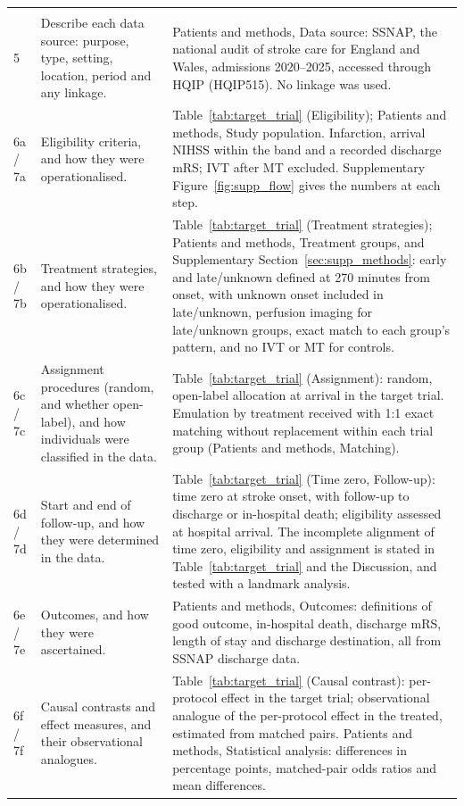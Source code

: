 {\begin{longtable}{p{1.0cm} p{4.6cm} p{10.4cm}}
\addlinespace
\multicolumn{3}{l}{\textbf{Methods}}\\
5 & Describe each data source: purpose, type, setting, location, period and any linkage. & Patients and methods, Data source: SSNAP, the national audit of stroke care for England and Wales, admissions 2020--2025, accessed through HQIP (HQIP515). No linkage was used. \\
6a / 7a & Eligibility criteria, and how they were operationalised. & Table~\ref{tab:target_trial} (Eligibility); Patients and methods, Study population. Infarction, arrival NIHSS within the band and a recorded discharge mRS; IVT after MT excluded. Supplementary Figure~\ref{fig:supp_flow} gives the numbers at each step. \\
6b / 7b & Treatment strategies, and how they were operationalised. & Table~\ref{tab:target_trial} (Treatment strategies); Patients and methods, Treatment groups, and Supplementary Section~\ref{sec:supp_methods}: early and late/unknown defined at 270 minutes from onset, with unknown onset included in late/unknown, perfusion imaging for late/unknown groups, exact match to each group's pattern, and no IVT or MT for controls. \\
6c / 7c & Assignment procedures (random, and whether open-label), and how individuals were classified in the data. & Table~\ref{tab:target_trial} (Assignment): random, open-label allocation at arrival in the target trial. Emulation by treatment received with 1:1 exact matching without replacement within each trial group (Patients and methods, Matching). \\
6d / 7d & Start and end of follow-up, and how they were determined in the data. & Table~\ref{tab:target_trial} (Time zero, Follow-up): time zero at stroke onset, with follow-up to discharge or in-hospital death; eligibility assessed at hospital arrival. The incomplete alignment of time zero, eligibility and assignment is stated in Table~\ref{tab:target_trial} and the Discussion, and tested with a landmark analysis. \\
6e / 7e & Outcomes, and how they were ascertained. & Patients and methods, Outcomes: definitions of good outcome, in-hospital death, discharge mRS, length of stay and discharge destination, all from SSNAP discharge data. \\
6f / 7f & Causal contrasts and effect measures, and their observational analogues. & Table~\ref{tab:target_trial} (Causal contrast): per-protocol effect in the target trial; observational analogue of the per-protocol effect in the treated, estimated from matched pairs. Patients and methods, Statistical analysis: differences in percentage points, matched-pair odds ratios and mean differences. \\

\end{longtable}}
